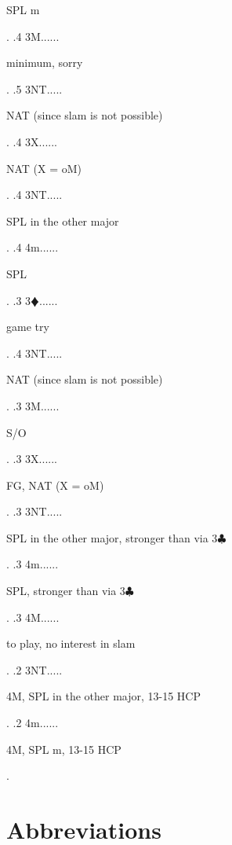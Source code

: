 \documentclass[a4paper]{article}
\newcommand{\BC}{\textcolor{OliveGreen}{$\clubsuit$}}
\newcommand{\BD}{\textcolor{RedOrange}{$\vardiamondsuit$}}
\begin{document}
{\begin{minipage}[t]{0.8\textwidth}
SPL m
\end{minipage}. 
 .4 3M......\begin{minipage}[t]{0.8\textwidth}
minimum, sorry
\end{minipage}. 
 .5 3NT.....\begin{minipage}[t]{0.8\textwidth}
NAT (since slam is not possible)
\end{minipage}. 
 .4 3X......\begin{minipage}[t]{0.8\textwidth}
NAT (X = oM)
\end{minipage}. 
 .4 3NT.....\begin{minipage}[t]{0.8\textwidth}
SPL in the other major
\end{minipage}. 
 .4 4m......\begin{minipage}[t]{0.8\textwidth}
SPL
\end{minipage}. 
 .3 3\BD......\begin{minipage}[t]{0.8\textwidth}
game try
\end{minipage}. 
 .4 3NT.....\begin{minipage}[t]{0.8\textwidth}
NAT (since slam is not possible)
\end{minipage}. 
 .3 3M......\begin{minipage}[t]{0.8\textwidth}
S/O
\end{minipage}. 
 .3 3X......\begin{minipage}[t]{0.8\textwidth}
FG, NAT (X = oM)
\end{minipage}. 
 .3 3NT.....\begin{minipage}[t]{0.8\textwidth}
SPL in the other major, stronger than via 3\BC 
\end{minipage}. 
 .3 4m......\begin{minipage}[t]{0.8\textwidth}
SPL, stronger than via 3\BC 
\end{minipage}. 
 .3 4M......\begin{minipage}[t]{0.8\textwidth}
to play, no interest in slam
\end{minipage}. 
 .2 3NT.....\begin{minipage}[t]{0.8\textwidth}
4M, SPL in the other major, 13-15 HCP
\end{minipage}. 
 .2 4m......\begin{minipage}[t]{0.8\textwidth}
4M, SPL m, 13-15 HCP
\end{minipage}. 
}
\bigbreak
\section{Abbreviations}
\end{document}
